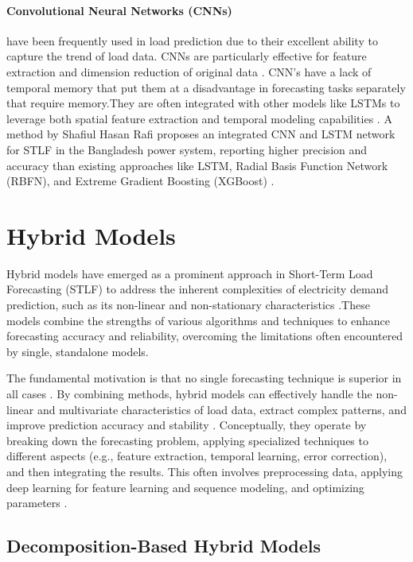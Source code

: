   \paragraph{Convolutional Neural Networks (CNNs)} have been frequently used in load prediction due to their excellent ability to capture the trend of load data. CNNs are particularly effective for feature extraction and dimension reduction of original data \cite{hiceemdanQteg}. CNN's have a lack of temporal memory that put them at a disadvantage in forecasting tasks  separately that require memory.They are often integrated with other models like LSTMs to leverage both spatial feature extraction and temporal modeling capabilities \cite{rafi2021short}. A method by Shafiul Hasan Rafi proposes an integrated CNN and LSTM network for STLF in the Bangladesh power system, reporting higher precision and accuracy than existing approaches like LSTM, Radial Basis Function Network (RBFN), and Extreme Gradient Boosting (XGBoost) \cite{rafi2021short}.
 
 
 \section{ Hybrid Models } 
 
 Hybrid models have emerged as a prominent approach in Short-Term Load Forecasting (STLF) to address the inherent complexities of electricity demand prediction, such as its non-linear and non-stationary characteristics \cite{dong2021short}.These models combine the strengths of various algorithms and techniques to enhance forecasting accuracy and reliability, overcoming the limitations often encountered by single, standalone models.
 
 The fundamental motivation is that no single forecasting technique is superior in all cases \cite{li2023short}. By combining methods, hybrid models can effectively handle the non-linear and multivariate characteristics of load data, extract complex patterns, and improve prediction accuracy and stability \cite{li2023short}. Conceptually, they operate by breaking down the forecasting problem, applying specialized techniques to different aspects (e.g., feature extraction, temporal learning, error correction), and then integrating the results. This often involves preprocessing data, applying deep learning for feature learning and sequence modeling, and optimizing parameters \cite{kong2019improved}.
 
 \subsection{Decomposition-Based Hybrid Models } 
 

